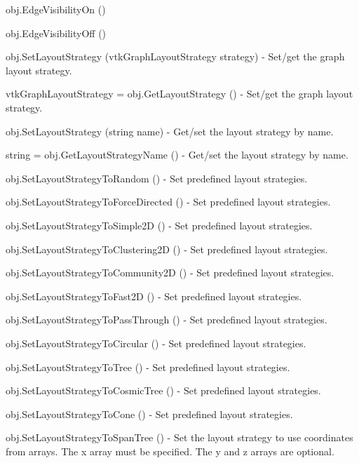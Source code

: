 \begin{DoxyItemize}
\item {\ttfamily obj.\-Edge\-Visibility\-On ()}  
\item {\ttfamily obj.\-Edge\-Visibility\-Off ()}  
\item {\ttfamily obj.\-Set\-Layout\-Strategy (vtk\-Graph\-Layout\-Strategy strategy)} -\/ Set/get the graph layout strategy.  
\item {\ttfamily vtk\-Graph\-Layout\-Strategy = obj.\-Get\-Layout\-Strategy ()} -\/ Set/get the graph layout strategy.  
\item {\ttfamily obj.\-Set\-Layout\-Strategy (string name)} -\/ Get/set the layout strategy by name.  
\item {\ttfamily string = obj.\-Get\-Layout\-Strategy\-Name ()} -\/ Get/set the layout strategy by name.  
\item {\ttfamily obj.\-Set\-Layout\-Strategy\-To\-Random ()} -\/ Set predefined layout strategies.  
\item {\ttfamily obj.\-Set\-Layout\-Strategy\-To\-Force\-Directed ()} -\/ Set predefined layout strategies.  
\item {\ttfamily obj.\-Set\-Layout\-Strategy\-To\-Simple2\-D ()} -\/ Set predefined layout strategies.  
\item {\ttfamily obj.\-Set\-Layout\-Strategy\-To\-Clustering2\-D ()} -\/ Set predefined layout strategies.  
\item {\ttfamily obj.\-Set\-Layout\-Strategy\-To\-Community2\-D ()} -\/ Set predefined layout strategies.  
\item {\ttfamily obj.\-Set\-Layout\-Strategy\-To\-Fast2\-D ()} -\/ Set predefined layout strategies.  
\item {\ttfamily obj.\-Set\-Layout\-Strategy\-To\-Pass\-Through ()} -\/ Set predefined layout strategies.  
\item {\ttfamily obj.\-Set\-Layout\-Strategy\-To\-Circular ()} -\/ Set predefined layout strategies.  
\item {\ttfamily obj.\-Set\-Layout\-Strategy\-To\-Tree ()} -\/ Set predefined layout strategies.  
\item {\ttfamily obj.\-Set\-Layout\-Strategy\-To\-Cosmic\-Tree ()} -\/ Set predefined layout strategies.  
\item {\ttfamily obj.\-Set\-Layout\-Strategy\-To\-Cone ()} -\/ Set predefined layout strategies.  
\item {\ttfamily obj.\-Set\-Layout\-Strategy\-To\-Span\-Tree ()} -\/ Set the layout strategy to use coordinates from arrays. The x array must be specified. The y and z arrays are optional.  

\end{DoxyItemize}
